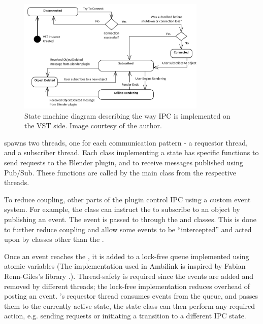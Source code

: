 \begin{figure}%
    \includegraphics[width=0.8\textwidth]{images/implementation/vst_ipc_state_machine.png}
    \centering
    \caption{State machine diagram describing the way IPC is implemented on the VST side.
             Image courtesy of the author. \label{fig:ipc_state_machine}}
\end{figure}

 spawns two threads, one for each communication pattern - a requestor thread, and a subscriber thread.
Each class implementing a state has specific functions to send requests to the Blender plugin,
and to receive messages published using Pub/Sub.
These functions are called by the main  class from the respective threads.

To reduce coupling, other parts of the plugin control IPC using a custom event system.
For example, the  class can instruct the  to subscribe to an object by publishing an event.
The event is passed to  through the  and  classes.
This is done to further reduce coupling and allow some events to be ``intercepted'' and acted upon by classes other than the .

Once an event reaches the , it is added to a lock-free queue implemented using atomic variables (The implementation used in Ambilink is inspired by Fabian Renn-Giles's  library \cite{farbot_repo}.).
Thread-safety is required since the events are added and removed by different threads; the lock-free implementation reduces overhead of posting an event.
's requestor thread consumes events from the queue, and passes them to the currently active state,
the state class can then perform any required action, e.g. sending requests or initiating a transition to a different IPC state.

